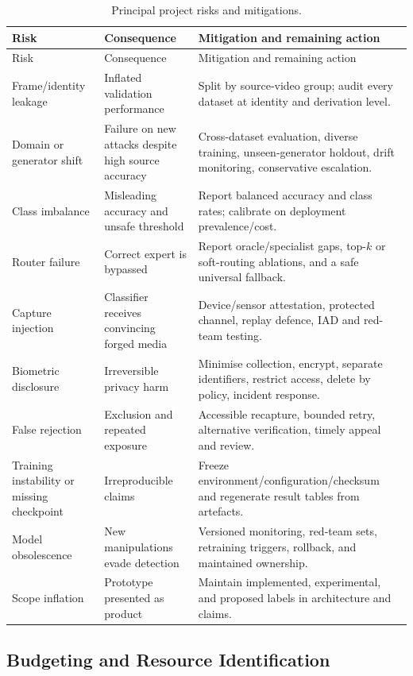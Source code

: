 \begin{longtable}{@{}p{35mm}p{42mm}p{55mm}@{}}
\caption{Principal project risks and mitigations.}\label{tab:risks}\\
\toprule
Risk & Consequence & Mitigation and remaining action \\
\midrule
\endfirsthead
\toprule
Risk & Consequence & Mitigation and remaining action \\
\midrule
\endhead
Frame/identity leakage & Inflated validation performance & Split by source-video
group; audit every dataset at identity and derivation level. \\
Domain or generator shift & Failure on new attacks despite high source accuracy &
Cross-dataset evaluation, diverse training, unseen-generator holdout, drift
monitoring, conservative escalation. \\
Class imbalance & Misleading accuracy and unsafe threshold & Report balanced
accuracy and class rates; calibrate on deployment prevalence/cost. \\
Router failure & Correct expert is bypassed & Report oracle/specialist gaps,
top-$k$ or soft-routing ablations, and a safe universal fallback. \\
Capture injection & Classifier receives convincing forged media & Device/sensor
attestation, protected channel, replay defence, IAD and red-team testing. \\
Biometric disclosure & Irreversible privacy harm & Minimise collection, encrypt,
separate identifiers, restrict access, delete by policy, incident response. \\
False rejection & Exclusion and repeated exposure & Accessible recapture, bounded
retry, alternative verification, timely appeal and review. \\
Training instability or missing checkpoint & Irreproducible claims & Freeze
environment/configuration/checksum and regenerate result tables from artefacts. \\
Model obsolescence & New manipulations evade detection & Versioned monitoring,
red-team sets, retraining triggers, rollback, and maintained ownership. \\
Scope inflation & Prototype presented as product & Maintain implemented,
experimental, and proposed labels in architecture and claims. \\
\bottomrule
\end{longtable}

\subsection{Budgeting and Resource Identification}

